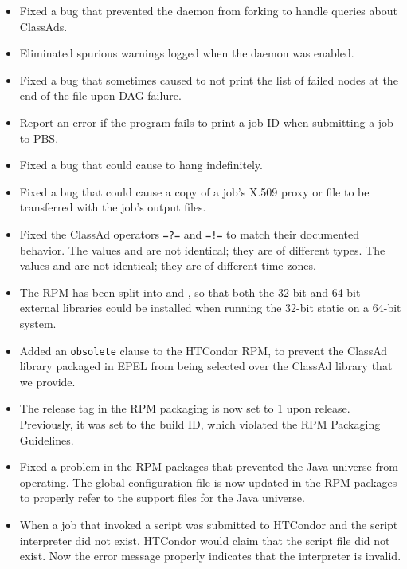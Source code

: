 \begin{itemize}
\item Fixed a bug that prevented the  daemon from forking 
to handle queries about  ClassAds.

\item Eliminated spurious warnings logged when the 
daemon was enabled.

\item Fixed a bug that sometimes caused  to not print
the list of failed nodes at the end of the  file upon
DAG failure.

\item Report an error if the  program fails to print a job ID
when submitting a job to PBS. 

\item Fixed a bug that could cause  to hang
indefinitely.

\item Fixed a bug that could cause a copy of a job's X.509 proxy
or file  to be transferred with
the job's output files.

\item Fixed the ClassAd operators \verb+=?=+ and \verb+=!=+ to match
their documented behavior.
The values  and  are not identical; 
they are of different types.
The values  and
 are not identical;
they are of different time zones.

\item The  RPM has been split into
 and ,
so that both the 32-bit and 64-bit external
libraries could be installed when running the 32-bit static 
on a 64-bit system.

\item Added an \texttt{obsolete} clause to the HTCondor RPM,
to prevent the ClassAd library packaged in EPEL from being selected 
over the ClassAd library that we provide.

\item 
The release tag in the RPM packaging is now set to 1 upon release.
Previously, it was set to the build ID, which violated the RPM Packaging
Guidelines.

\item Fixed a problem in the RPM packages that prevented the
Java universe from operating.
The global configuration file is now updated in the RPM packages
to properly refer to the support files for the Java universe.

\item When a job that invoked a script was submitted to HTCondor and
the script interpreter did not exist, HTCondor would claim that the
script file did not exist.
Now the error message properly indicates that the interpreter is invalid.

\end{itemize}

